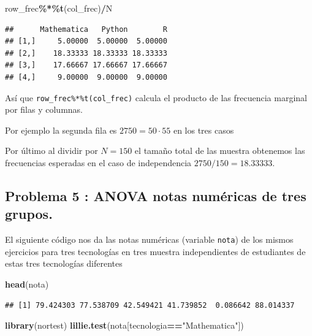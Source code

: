 \documentclass[
]{article}
\newenvironment{Shaded}{\begin{snugshade}}{\end{snugshade}}
\newcommand{\KeywordTok}[1]{\textcolor[rgb]{0.13,0.29,0.53}{\textbf{#1}}}
\newcommand{\NormalTok}[1]{#1}
\newcommand{\OperatorTok}[1]{\textcolor[rgb]{0.81,0.36,0.00}{\textbf{#1}}}
\newcommand{\StringTok}[1]{\textcolor[rgb]{0.31,0.60,0.02}{#1}}
\begin{document}
\begin{Shaded}
\begin{Highlighting}[]
\NormalTok{row\_frec}\OperatorTok{\%*\%}\KeywordTok{t}\NormalTok{(col\_frec)}\OperatorTok{/}\NormalTok{N}
\end{Highlighting}
\end{Shaded}

\begin{verbatim}
##      Mathematica   Python        R
## [1,]     5.00000  5.00000  5.00000
## [2,]    18.33333 18.33333 18.33333
## [3,]    17.66667 17.66667 17.66667
## [4,]     9.00000  9.00000  9.00000
\end{verbatim}

Así que \texttt{row\_frec\%*\%t(col\_frec)} calcula el producto de las
frecuencia marginal por filas y columnas.

Por ejemplo la segunda fila es \(2750= 50\cdot 55\) en los tres casos

Por último al dividir por \(N=150\) el tamaño total de las muestra
obtenemos las frecuencias esperadas en el caso de independencia
\(2750/150=18.33333\).

\hypertarget{problema-5-anova-notas-numuxe9ricas-de-tres-grupos.}{%
\subsection{Problema 5 : ANOVA notas numéricas de tres
grupos.}\label{problema-5-anova-notas-numuxe9ricas-de-tres-grupos.}}

El siguiente código nos da las notas numéricas (variable \texttt{nota})
de los mismos ejercicios para tres tecnologías en tres muestra
independientes de estudiantes de estas tres tecnologías diferentes

\begin{Shaded}
\begin{Highlighting}[]
\KeywordTok{head}\NormalTok{(nota)}
\end{Highlighting}
\end{Shaded}

\begin{verbatim}
## [1] 79.424303 77.538709 42.549421 41.739852  0.086642 88.014337
\end{verbatim}

\begin{Shaded}
\begin{Highlighting}[]
\KeywordTok{library}\NormalTok{(nortest)}
\KeywordTok{lillie.test}\NormalTok{(nota[tecnologia}\OperatorTok{==}\StringTok{"Mathematica"}\NormalTok{])}
\end{Highlighting}
\end{Shaded}
\end{document}
